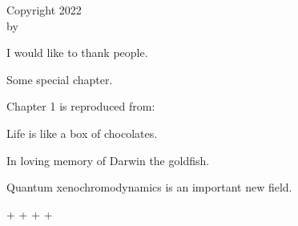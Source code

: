 

\ShowTitle

\begin{Copyright}
\large
Copyright 2022\\[\bigskipamount] by\\[\bigskipamount] \GetAuthors
\end{Copyright}

\begin{Acknowledgments}
I would like to thank people.
\end{Acknowledgments}




\begin{SpecialChapter}[title=Special chapter]
Some special chapter.
\end{SpecialChapter}

\begin{Contributions}
Chapter 1 is reproduced from:\\[\smallskipamount]
\end{Contributions}

\begin{Epigraph}
\large Life is like a box of chocolates.\\
\hrulefill
\end{Epigraph}

\begin{Dedication}
In loving memory of Darwin the goldfish.
\end{Dedication}

\begin{Abstract}
\AbstractHeader
Quantum xenochromodynamics is an important new field.
\end{Abstract}

\ShowTableOfContents
\ShowListOfFigures+
\ShowListOfTables+
\ShowListOfAbbreviations+
\ShowNomenclature+
